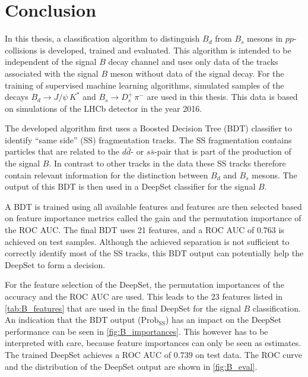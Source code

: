 \chapter{Conclusion}

In this thesis, a classification algorithm to distinguish $B_d$ from $B_s$ mesons in $pp$-collisions is developed, trained and evaluated.
This algorithm is intended to be independent of the signal $B$ decay channel and uses only data of the tracks associated with the signal $B$ meson without data of the signal decay.
For the training of supervised machine learning algorithms, simulated samples of the decays $B_d \rightarrow J/\psi \, K^*$ and $B_s \rightarrow D^+_s \, \pi^-$ are used in this thesis. This data is based on simulations of the LHCb detector in the year 2016.

The developed algorithm first uses a Boosted Decision Tree (BDT) classifier to identify \enquote{same side} (SS) fragmentation tracks.
The SS fragmentation contains particles that are related to the $d\bar{d}$- or $s\bar{s}$-pair that is part of the production of the signal $B$. 
In contrast to other tracks in the data these SS tracks therefore contain relevant information for the distinction between $B_d$ and $B_s$ mesons.
The output of this BDT is then used in a DeepSet classifier for the signal $B$.

A BDT is trained using all available features and features are then selected based on feature importance metrics called the gain and the permutation importance of the ROC AUC. 
The final BDT uses 21 features, and a ROC AUC of $0.763$ is achieved on test samples.
Although the achieved separation is not sufficient to correctly identify most of the SS tracks, this BDT output can potentially help the DeepSet to form a decision.

For the feature selection of the DeepSet, the permutation importances of the accuracy and the ROC AUC are used.
This leads to the 23 features listed in \cref{tab:B_features} that are used in the final DeepSet for the signal $B$ classification.
An indication that the BDT output ($\text{Prob}_\text{SS}$) has an impact on the DeepSet performance can be seen in \cref{fig:B_importances}.
This however has to be interpreted with care, because feature importances can only be seen as estimates.
The trained DeepSet achieves a ROC AUC of $0.739$ on test data.
The ROC curve and the distribution of the DeepSet output are shown in \cref{fig:B_eval}.

